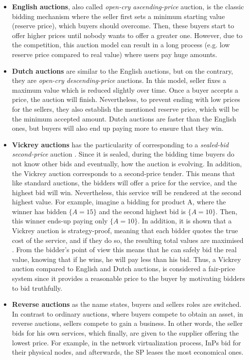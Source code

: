 \begin{itemize}
	\item \textbf{English auctions}, also called \textit{open-cry ascending-price} auction, is the classic bidding mechanism where the seller first sets a minimum starting value (reserve price), which buyers should overcome. Then, these buyers start to offer higher prices until nobody wants to offer a greater one. However, due to the competition, this auction model can result in a long process (e.g. low reserve price compared to real value) where users pay huge amounts.
	\item \textbf{Dutch auctions} are similar to the English auctions, but on the contrary, they are \textit{open-cry descending-price} auctions. In this model, seller fixes a maximum value which is reduced slightly over time. Once a buyer accepts a price, the auction will finish. Nevertheless, to prevent ending with low prices for the sellers, they also establish the mentioned reserve price, which will be the minimum accepted amount. Dutch auctions are faster than the English ones, but buyers will also end up paying more to ensure that they win.
	\item \textbf{Vickrey auctions} has the particularity of corresponding to a \textit{sealed-bid second-price} auction \cite{vickrey1961counterspeculation}. Since it is sealed, during the bidding time buyers do not know other bids and eventually, how the auction is evolving. In addition, the Vickrey auction corresponds to a second-price tender. This means that like standard auctions, the bidders will offer a price for the service, and the highest bid will win. Nevertheless, this service will be rendered at the second highest value. For example, imagine a bidding for product A, where the winner has bidden $\{A = 15\}$ and the second highest bid is $\{A = 10\}$. Then, this winner ends-up paying only $\{A = 10\}$. In addition, it is shown that a Vickrey auction is strategy-proof, meaning that each bidder quotes the true cost of the service, and if they do so, the resulting total values are maximised  \cite{vickrey1961counterspeculation}. From the bidder's point of view this means that he can safely bid the real value, knowing that if he wins, he will pay less than his bid. Thus, a Vickrey auction compared to English and Dutch auctions, is considered a fair-price system since it provides a reasonable price to the buyer by motivating bidders to bid truthfully.
	\item \textbf{Reverse auctions} as the name states, buyers and sellers roles are switched. In contrast to ordinary auctions, where buyers compete to obtain an asset, in reverse auctions, sellers compete to gain a business. In other words, the seller bids for his own services, which finally, are given to the supplier offering the lowest price. For example, in the network virtualization process, InPs bid for their physical nodes, and afterwards, the SP leases the most economical ones.
\end{itemize}

